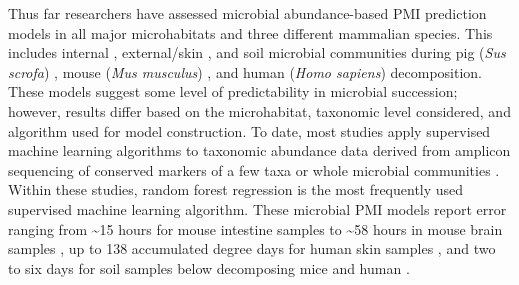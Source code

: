 \documentclass[
  10pt,
  letterpaper,
]{article}
\begin{document}
Thus far researchers have assessed microbial abundance-based PMI
prediction models in all major microhabitats and three different
mammalian species. This includes internal
\citep{liu_predicting_2020, hu_predicting_2021}, external/skin
\citep{pechal_potential_2014, johnson_machine_2016, metcalf_microbial_2016, belk_microbiome_2018},
and soil \citep{belk_microbiome_2018} microbial communities during pig
(\emph{Sus scrofa}) \citep{pechal_potential_2014}, mouse (\emph{Mus
musculus})
\citep{metcalf_microbial_2016, liu_predicting_2020, belk_microbiome_2018},
and human (\emph{Homo sapiens})
\citep{johnson_machine_2016, metcalf_microbial_2016, hu_predicting_2021, belk_microbiome_2018}
decomposition. These models suggest some level of predictability in
microbial succession; however, results differ based on the microhabitat,
taxonomic level considered, and algorithm used for model construction.
To date, most studies apply supervised machine learning algorithms to
taxonomic abundance data derived from amplicon sequencing of conserved
markers of a few taxa \citep{pechal_potential_2014} or whole microbial
communities
\citep{johnson_machine_2016, metcalf_microbial_2016, liu_predicting_2020, hu_predicting_2021, belk_microbiome_2018}.
Within these studies, random forest regression is the most frequently
used supervised machine learning algorithm. These microbial PMI models
report error ranging from \textasciitilde15 hours for mouse intestine
samples to \textasciitilde58 hours in mouse brain samples
\citep{liu_predicting_2020}, up to 138 accumulated degree days for human
skin samples \citep{johnson_machine_2016}, and two to six days for soil
samples below decomposing mice and human \citep{belk_microbiome_2018}.
\end{document}
